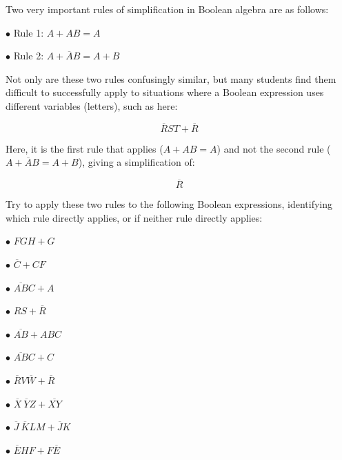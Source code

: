 

Two very important rules of simplification in Boolean algebra are as follows:
\medskip
\item{$\bullet$} Rule 1: $A + AB = A$
\item{$\bullet$} Rule 2: $A + \overline{A}B = A + B$
\medskip

Not only are these two rules confusingly similar, but many students find them difficult to successfully apply to situations where a Boolean expression uses different variables (letters), such as here:

$$\overline{R}ST + \overline{R}$$

Here, it is the first rule that applies ($A + AB = A$) and not the second rule ($A + \overline{A}B = A + B$), giving a simplification of:

$$\overline{R}$$

\goodbreak
Try to apply these two rules to the following Boolean expressions, identifying which rule directly applies, or if neither rule directly applies:

\medskip
\item{$\bullet$} $FGH + G$
\vskip 5pt
\item{$\bullet$} $\overline{C} + CF$
\vskip 5pt
\item{$\bullet$} $\overline{AB}C + A$
\vskip 5pt
\item{$\bullet$} $RS + \overline{R}$
\vskip 5pt
\item{$\bullet$} $\overline{AB} + ABC$
\vskip 5pt
\item{$\bullet$} $\overline{AB}C + C$
\vskip 5pt
\item{$\bullet$} $\overline{R}V\overline{W} + \overline{R}$
\vskip 5pt
\item{$\bullet$} $\overline{X} \> \overline{Y} Z + \overline{XY}$
\vskip 5pt
\item{$\bullet$} $\overline{J} \> \overline{K} L M + \overline{J}K$
\vskip 5pt
\item{$\bullet$} $\overline{E}HF + F\overline{E}$
\medskip







